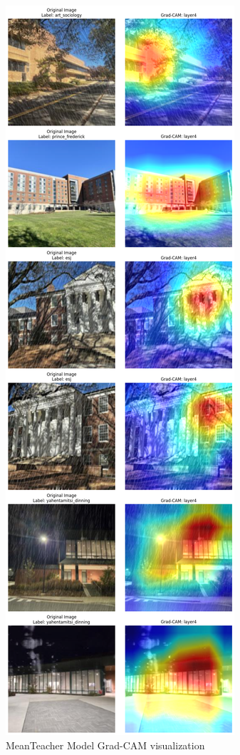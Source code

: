 \documentclass{article}
\begin{document}
\begin{figure}[H]
    \centering
    \includegraphics[trim={0 38cm 0 12.7cm},clip,width=0.6\linewidth]{meanteacher.png}
    \caption{MeanTeacher Model Grad-CAM visualization}
    \label{fig:meanteacher_results}
\end{figure}
\end{document}

